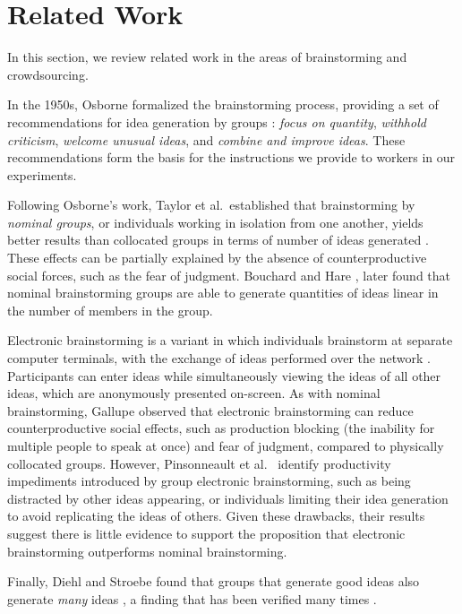 \section{Related Work}
In this section, we review related work in the areas of brainstorming and crowdsourcing.

In the 1950s, Osborne formalized the brainstorming process, providing a set of recommendations for idea generation by groups \cite{osborn_applied_1957}: \emph{focus on quantity}, \emph{withhold criticism}, \emph{welcome unusual ideas}, and \emph{combine and improve ideas}. These recommendations form the basis for the instructions we provide to workers in our experiments.

Following Osborne's work, Taylor et al.\ established that brainstorming by \emph{nominal groups}, or individuals working in isolation from one another, yields better results than collocated groups in terms of number of ideas generated \cite{taylor_does_1958}. These effects can be partially explained by the absence of counterproductive social forces, such as the fear of judgment. Bouchard and Hare \cite{bouchard_jr_size_1970}, later found that nominal brainstorming groups are able to generate quantities of ideas linear in the number of members in the group.

Electronic brainstorming is a variant in which individuals brainstorm at separate computer terminals, with the exchange of ideas performed over the network \cite{gallupe_electronic_1992}. Participants can enter ideas while simultaneously viewing the ideas of all other ideas, which are anonymously presented on-screen. As with nominal brainstorming, Gallupe \cite{gallupe_electronic_1992} observed that electronic brainstorming can reduce counterproductive social effects, such as production blocking (the inability for multiple people to speak at once) and fear of judgment, compared to physically collocated groups. However, Pinsonneault et al.\ \cite{pinsonneault_electronic_1999} identify productivity impediments introduced by group electronic brainstorming, such as being distracted by other ideas appearing, or individuals limiting their idea generation to avoid replicating the ideas of others. Given these drawbacks, their results suggest there is little evidence to support the proposition that electronic brainstorming outperforms nominal brainstorming.

Finally, Diehl and Stroebe found that groups that generate good ideas also generate \emph{many} ideas \cite{diehl_productivity_1987}, a finding that has been verified many times \cite{briggs1997quality, parnes1959effects, parnes_effects_1961, shah2003metrics, cross1996creativity}.

